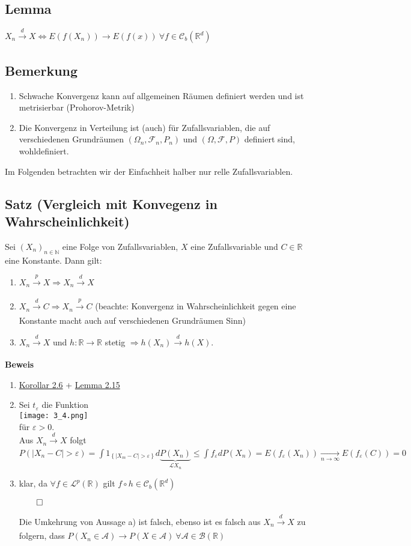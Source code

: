\documentclass[german,10pt,oneside, fleqn, a4paper]{article}
\newcommand {\R}	{\mathbb{R}}
\newcommand {\N}	{\mathbb{N}}
\newcommand{\Ra}	{\Rightarrow}
\newcommand{\LRa}{\Leftrightarrow}
\newcommand{\ra}{\rightarrow}
\newcommand{\brc}[1]{\left(#1\right)}
\newcommand{\brac}[1]{\left\lbrace #1\right\rbrace}
\newcommand{\folge}[3][\N]{\left(#2_#3\right)_{#3\in #1}}
\newcommand{\QED}{\begin{flushright}$\qed$\end{flushright}}
\newcommand{\mc}[1]{\mathcal{#1}}
\newcommand{\lp}[1]{\mc{L}^{#1}}
\newcommand{\beweis}{\textbf{Beweis}\\}
\newcommand{\toinf}{\rightarrow\infty}
\newcommand{\1}[1]{1_{#1}}
\newcommand{\2}[1]{\1{\brac{#1}}}
\newcommand{\xr}[2][]{\xrightarrow[#1]{#2}}
\newcommand{\cb}[1][d]{\mc{C}_b\brc{\R^{#1}}}
\newcommand{\raum}{\brc{\Omega,\mc{F},P}}
\newcommand{\f}{\mc{F}}
\begin{document}
\subsection{Lemma}
$X_n\xr{d}X\LRa E(f(X_n))\ra E(f(x))\ \forall f\in\cb{}$

\subsection{Bemerkung}
\begin{enumerate}[label=(\alph*)]
\item Schwache Konvergenz kann auf allgemeinen Räumen definiert werden und ist metrisierbar (Prohorov-Metrik)
\item Die Konvergenz in Verteilung ist (auch) für Zufallsvariablen, die auf verschiedenen Grundräumen $(\Omega_n,\f_n,P_n)$ und $\raum$ definiert sind, wohldefiniert.
\end{enumerate}
Im Folgenden betrachten wir der Einfachheit halber nur relle Zufallsvariablen.

\subsection{Satz (Vergleich mit Konvegenz in Wahrscheinlichkeit)}
\label{3.4}
Sei $\folge{X}{n}$ eine Folge von Zufallsvariablen, $X$ eine Zufallsvariable und $C\in\R$ eine  Konstante. Dann gilt:\begin{enumerate}[label=(\alph*)]
\item $X_n\xr{p}X\Ra X_n\xr{d}X$
\item $X_n\xr{d}C\Ra X_n\xr{p}C$ (beachte: Konvergenz in Wahrscheinlichkeit gegen eine Konstante macht auch auf verschiedenen Grundräumen Sinn)
\item $X_n\xr{d}X$ und $h:\R\ra\R$ stetig $\Ra h(X_n)\xr{d}h(X)$.
\end{enumerate}
\beweis
\begin{enumerate}[label=(\alph*)]
\item \hyperref[2.6]{Korollar 2.6} + \hyperref[2.15]{Lemma 2.15}
\item Sei $t_\varepsilon$ die Funktion\\
\texttt{[image: 3\_4.png]}\\
für $\varepsilon>0$.\\
Aus $X_n\xr{d}X$ folgt $P(|X_n-C|>\varepsilon)=\int \1{\brac{|X_m-C|>\varepsilon}}d\underbrace{P(X_n)}_{\mc{L}X_n}\leq\int f_\varepsilon dP(X_n)=E(f_\varepsilon(X_n))\xr[n\toinf]{}E(f_\varepsilon(C))=0$
\item klar, da $\forall f\in\lp{p}(\R)$ gilt $f\circ h\in\cb{}$\QED
Die Umkehrung von Aussage a) ist falsch, ebenso ist es falsch aus $X_n\xr{d}X$ zu folgern, dass $P(X_n\in\mc{A})\ra P(X\in\mc{A})\ \forall\mc{A}\in\mc{B}(\R)$
\end{enumerate}
\end{document}
